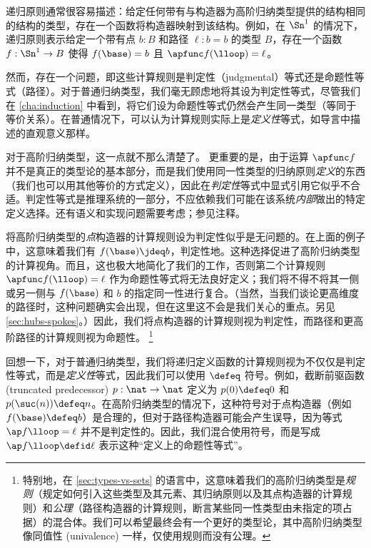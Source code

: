 %
%
递归原则通常很容易描述：给定任何带有与构造器为高阶归纳类型提供的结构相同的结构的类型，存在一个函数将构造器映射到该结构。例如，在 $\Sn^1$ 的情况下，递归原则表示给定一个带有点 $b:B$ 和路径 $\ell:b=b$ 的类型 $B$，存在一个函数 $f:\Sn^1\to B$ 使得 $f(\base)=b$ 且 $\apfunc f (\lloop) = \ell$。

%
%
然而，存在一个问题，即这些计算规则是判定性（judgmental）等式还是命题性等式（路径）。对于普通归纳类型，我们毫无顾虑地将其设为判定性等式，尽管我们在 \cref{cha:induction} 中看到，将它们设为命题性等式仍然会产生同一类型（等同于等价关系）。在普通情况下，可以认为计算规则实际上是\emph{定义性}等式，如导言中描述的直观意义那样。

%
对于高阶归纳类型，这一点就不那么清楚了。%
更重要的是，由于运算 $\apfunc f$ 并不是真正的类型论的基本部分，而是我们使用同一性类型的归纳原则\emph{定义}的东西（我们也可以用其他等价的方式定义），因此在\emph{判定性}等式中显式引用它似乎不合适。判定性等式是推理系统的一部分，不应依赖我们可能在该系统\emph{内部}做出的特定定义选择。还有语义和实现问题需要考虑；参见注释。

将高阶归纳类型的\emph{点}构造器的计算规则设为判定性似乎是无问题的。在上面的例子中，这意味着我们有 $f(\base)\jdeq b$，判定性地。这种选择促进了高阶归纳类型的计算视角。而且，这也极大地简化了我们的工作，否则第二个计算规则 $\apfunc f (\lloop) = \ell$ 作为命题性等式将无法良好定义；我们将不得不将其一侧或另一侧与 $f(\base)$ 和 $b$ 的指定同一性进行复合。（当然，当我们谈论更高维度的路径时，这种问题确实会出现，但在这里这不会是我们关心的重点。另见 \cref{sec:hubs-spokes}。）因此，我们将点构造器的计算规则视为判定性，而路径和更高阶路径的计算规则视为命题性。%
\footnote{特别地，在 \cref{sec:types-vs-sets} 的语言中，这意味着我们的高阶归纳类型是\emph{规则}（规定如何引入这些类型及其元素、其归纳原则以及其点构造器的计算规则）和\emph{公理}（路径构造器的计算规则，断言某些同一性类型由未指定的项占据）的混合体。我们可以希望最终会有一个更好的类型论，其中高阶归纳类型像同值性 (univalence) 一样，仅使用规则而没有公理。%
%
%
}

\begin{rmk}\label{rmk:defid}
回想一下，对于普通归纳类型，我们将递归定义函数的计算规则视为不仅仅是判定性等式，而是\emph{定义性}等式，因此我们可以使用 $\defeq$ 符号。例如，截断前驱函数 (truncated predecessor) $p:\nat\to\nat$ 定义为 $p(0)\defeq 0$ 和 $p(\suc(n))\defeq n$。在高阶归纳类型的情况下，这种符号对于点构造器（例如 $f(\base)\defeq b$）是合理的，但对于路径构造器可能会产生误导，因为等式 $\ap f \lloop = \ell$ 并不是判定性的。因此，我们混合使用符号，而是写成 $\ap f \lloop \defid \ell$ 表示这种“定义上的命题性等式”。
\end{rmk}
%
%

